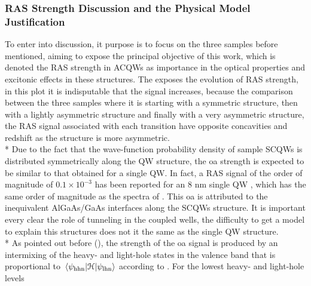 \subsubsection{RAS Strength Discussion and the Physical Model Justification}
\label{subsubsec:chapter-3-ras-discussed}
\vspace{-10mm}
To enter into discussion, it purpose is to focus on the three samples before mentioned, aiming to expose the principal objective of this work, which is denoted the \gls{RAS} strength in \gls{ACQWs} as importance in the  optical properties and excitonic effects in these structures. The  exposes the evolution of \gls{RAS} strength, in this plot it is indisputable that the signal increases, because the comparison between the three samples where it is starting with a symmetric structure, then with a lightly asymmetric structure and finally with a very asymmetric structure, the \gls{RAS} signal associated with each transition have opposite concavities and redshift as the structure is more asymmetric. \\*
Due to the fact that the wave-function probability density of sample \gls{SCQWs} is distributed symmetrically along the QW
structure, the \gls{oa} strength is expected to be similar to that
obtained for a single \gls{QW}. In fact, a \gls{RAS} signal of the order of magnitude of $0.1\times 10^{-3}$ has been reported for an 8 nm single \gls{QW} \cite{chen2002interface}, which has the same order of magnitude as the spectra of . This \gls{oa} is attributed to the inequivalent AlGaAs/GaAs interfaces along the \gls{SCQWs}
structure. It is important every clear the role of tunneling in the coupled wells, the difficulty to get a model to explain this structures  does not it the same as the single QW structure.  \\*
As pointed out before (), the strength of the \gls{oa} signal is produced by an intermixing of the heavy- and light-hole states in the valence band that is proportional to  $\mel{\psi_{\mathrm{hhn}}}{\cal{H}}{\psi_{\mathrm{lhn}}}$ according to . For the lowest heavy- and light-hole levels

